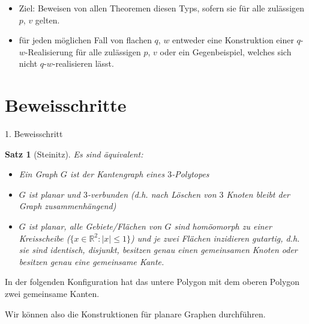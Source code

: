 \documentclass[10pt, notheorems]{beamer}
\newtheorem{theorem}{Satz}[section]
\newcommand{\set}[1]{\{ #1 \}}
\newcommand{\reals}{\mathbb{R}}
\newcommand{\hdef}[1]{\textcolor{darkred2}{#1}}
\begin{document}
\begin{frame}
  \begin{itemize}
  \item Ziel: Beweisen von allen Theoremen diesen Typs, sofern sie für alle zulässigen $p$, $v$ gelten.
    \pause
  \item für jeden möglichen Fall von flachen $q$, $w$ entweder eine Konstruktion einer $q$-$w$-Realisierung für alle zulässigen $p$, $v$ oder ein Gegenbeispiel, welches sich nicht $q$-$w$-realisieren lässt.
  \end{itemize}
\end{frame}

\section{Beweisschritte}

\begin{frame}{1. Beweisschritt}
  \begin{theorem}[{\sc Steinitz}]
    Es sind äquivalent:
    \begin{itemize}
    \item Ein Graph $G$ ist der Kantengraph eines $3$-Polytopes
    \item $G$ ist planar und $3$-verbunden (d.h. nach Löschen von $3$ Knoten bleibt der Graph zusammenhängend)
    \item $G$ ist planar, alle Gebiete/Flächen von $G$ sind homöomorph zu einer Kreisscheibe ($\set{x \in \reals^2 : |x| \leq 1}$) und je zwei Flächen \hdef{inzidieren gutartig}, d.h. sie sind identisch, disjunkt, besitzen genau einen gemeinsamen Knoten oder besitzen genau eine gemeinsame Kante.
    \end{itemize}
  \end{theorem}
  \pause
  \begin{example}
    In der folgenden Konfiguration hat das untere Polygon mit dem oberen Polygon zwei gemeinsame Kanten.
    
    { \centering
      \par
    }
  \end{example}
  
  Wir können also die Konstruktionen für planare Graphen durchführen.

\end{frame}
\end{document}
